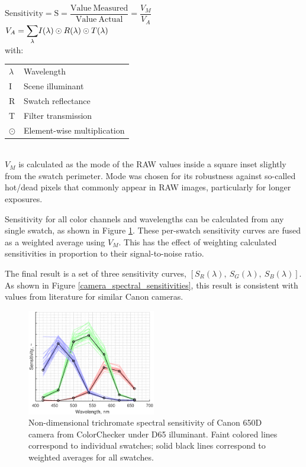\documentclass[twocolumn,10pt]{asme2ej}
\newcommand{\id}{\hspace{6 mm}}
\begin{document}
$\mathrm{ Sensitivity = S = \dfrac{Value \ Measured}{Value \ Actual} } = \dfrac{V_M}{V_A}$ \\

$V_A = \mathlarger{\sum_{\lambda}} I(\lambda) \odot R(\lambda) \odot T(\lambda)$ \\

with: \\

\begin{tabular}{l | l}
$\lambda$ & Wavelength \\
I & Scene illuminant\\
R & Swatch reflectance \\
T & Filter transmission \\
$\odot$ & Element-wise multiplication \\
\end{tabular} \\

$V_M$ is calculated as the mode of the RAW values inside a square inset slightly from the swatch perimeter. Mode was chosen for its robustness against so-called hot/dead pixels that commonly appear in RAW images, particularly for longer exposures.

\id Sensitivity for all color channels and wavelengths can be calculated from any single swatch, as shown in Figure \ref{canon_650d_sensitivity}. These per-swatch sensitivity curves are fused as a weighted average using $V_M$. This has the effect of weighting calculated sensitivities in proportion to their signal-to-noise ratio.

\id The final result is a set of three sensitivity curves, $\left[ S_R(\lambda), \ S_G(\lambda), \ S_B(\lambda) \right]$. As shown in Figure \ref{camera_spectral_sensitivities}, this result is consistent with values from literature for similar Canon cameras. \cite{Jiang}

\begin{figure}
\centering
\includegraphics[width=0.5\textwidth]{canon_650d_sensitivity.eps}
\caption{Non-dimensional trichromate spectral sensitivity of Canon 650D camera from ColorChecker under D65 illuminant. Faint colored lines correspond to individual swatches; solid black lines correspond to weighted averages for all swatches.}
\label{canon_650d_sensitivity}
\end{figure}
\end{document}
